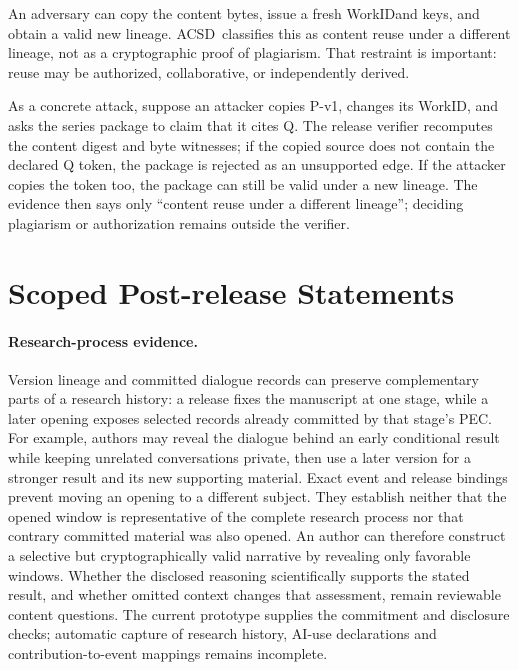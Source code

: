 \documentclass[conference,compsoc]{IEEEtran}
\newcommand{\workid}{\textsf{WorkID}}
\newcommand{\acsd}{\textsc{ACSD}}
\begin{document}
An adversary can copy the content bytes, issue a fresh \workid and keys, and obtain a valid new lineage. \acsd\ classifies this as content reuse under a different lineage, not as a cryptographic proof of plagiarism. That restraint is important: reuse may be authorized, collaborative, or independently derived.

As a concrete attack, suppose an attacker copies P-v1, changes its WorkID,
and asks the series package to claim that it cites Q. The release verifier
recomputes the content digest and byte witnesses; if the copied source does not
contain the declared Q token, the package is rejected as an unsupported edge.
If the attacker copies the token too, the package can still be valid under a
new lineage. The evidence then says only “content reuse under a different
lineage”; deciding plagiarism or authorization remains outside the verifier.

\section{Scoped Post-release Statements}

\paragraph{Research-process evidence.}
Version lineage and committed dialogue records can preserve complementary
parts of a research history: a release fixes the manuscript at one stage,
while a later opening exposes selected records already committed by that
stage's PEC. For example, authors may reveal the dialogue behind an early
conditional result while keeping unrelated conversations private, then use
a later version for a stronger result and its new supporting material.
Exact event and release bindings prevent moving an opening to a different
subject. They establish neither that the opened window is representative of
the complete research process nor that contrary committed material was also
opened. An author can therefore construct a selective but cryptographically
valid narrative by revealing only favorable windows. Whether the disclosed
reasoning scientifically supports the stated result, and whether omitted
context changes that assessment, remain reviewable content questions. The current prototype supplies
the commitment and disclosure checks; automatic capture of research history,
AI-use declarations and contribution-to-event mappings remains incomplete.
\end{document}
